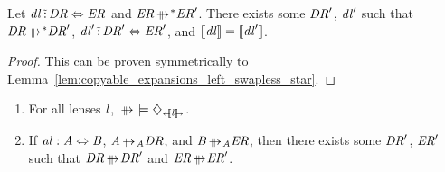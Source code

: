 \documentclass[numbers]{sigplanconf}
\begin{document}
\begin{lemma}
  \label{lem:copyable_expansions_right_swapless_star}
  Let $\mathit{dl} \,\tilde{:}\, \mathit{DR} \Leftrightarrow
  \mathit{ER}$ and $\DNFRegexAlt \StarOf{\ParallelRewrite} \DNFRegexAlt'$.
  There exists some
  $\mathit{DR}'$, $\mathit{dl}'$ such that $\DNFRegex
  \StarOf{\ParallelRewrite} \DNFRegex'$,
  $\mathit{dl}' \,\tilde{:}\,
  \mathit{DR}' \Leftrightarrow \mathit{ER}'$, and $[ \! [\mathit{dl}] \! ] =
  [ \! [\mathit{dl}'] \! ]$.
\end{lemma}
\begin{proof}
  This can be proven symmetrically to
  Lemma~\ref{lem:copyable_expansions_left_swapless_star}.
\end{proof}

\begin{theorem}
  \label{thm:parallel_confluence_noswap}
  \begin{enumerate}\leavevmode
  \item For all lenses $\mathit{l}$,
    $\IsConfluentWithPropertyOf{\ParallelRewrite}{\DNFLensHasSemanticsOf{\Lens}}$.
  \item If $\mathit{al} : \mathit{A} \Leftrightarrow \mathit{B}$, $\Atom
    \ParallelRewriteAtom \DNFRegex$, and $\AtomAlt \ParallelRewriteAtom \DNFRegexAlt$, then
    there exists some $\mathit{DR}'$, $\mathit{ER}'$ such that $\DNFRegex
    \ParallelRewrite \DNFRegex'$ and $\DNFRegexAlt \ParallelRewrite \DNFRegexAlt'$.
  \end{enumerate}
\end{theorem}
\end{document}
